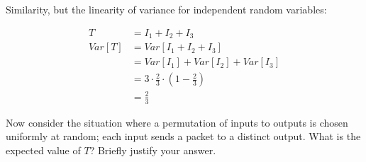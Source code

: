 \documentclass[12pt,oneside]{article}
\begin{document}
\begin{problem}{15}
{Similarity, but the linearity of variance for independent random variables:

\begin{align*}
T & = I_1 + I_2 + I_3 \\
Var[T] 
&= Var[I_1 + I_2 + I_3] \\
&= Var[I_1] + Var[I_2] + Var[I_3] \\
&= 3 \cdot \frac{2}{3} \cdot \left(1-\frac{2}{3}\right) \\
&= \frac{2}{3}
\end{align*}

}

\instatements{\newpage} 
Now consider the situation where a permutation of inputs to outputs is chosen uniformly at random; each input sends a packet to a distinct output. What is the expected value of $T$?  Briefly justify your answer.

\eparts
\end{problem}
\end{document}
